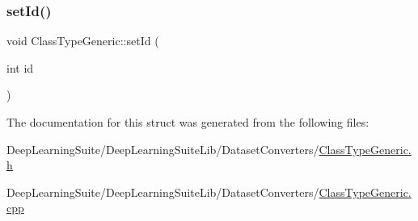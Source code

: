 \mbox{\label{struct_class_type_generic_abb29534e4b1c9e2b33c57df5e56ef2fb}} 
\subsubsection{\texorpdfstring{set\+Id()}{setId()}}
{\footnotesize\ttfamily void Class\+Type\+Generic\+::set\+Id (\begin{DoxyParamCaption}\item[{int}]{id }\end{DoxyParamCaption})}



The documentation for this struct was generated from the following files\+:\begin{DoxyCompactItemize}
\item 
Deep\+Learning\+Suite/\+Deep\+Learning\+Suite\+Lib/\+Dataset\+Converters/\hyperlink{_class_type_generic_8h}{Class\+Type\+Generic.\+h}\item 
Deep\+Learning\+Suite/\+Deep\+Learning\+Suite\+Lib/\+Dataset\+Converters/\hyperlink{_class_type_generic_8cpp}{Class\+Type\+Generic.\+cpp}\end{DoxyCompactItemize}
